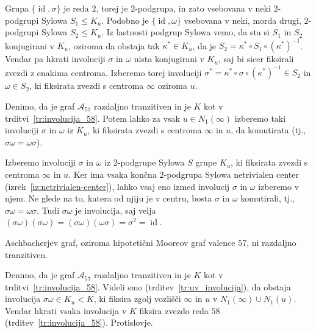 \documentclass[fin1, tisk]{fmfdelo}
\newcommand{\asch}{\mathscr{A}_{57}}
\newcommand{\id}{\operatorname{id}}
\begin{document}
\begin{dokaz}
    Grupa $\{\id, \sigma\}$ je reda $2$, torej je $2$-podgrupa, in zato vsebovana v neki
    $2$-podgrupi Sylowa $S_1 \leq K_{u}$. Podobno je $\{\id, \omega\}$ vsebovana v neki,
    morda drugi, $2$-podgrupi Sylowa $S_2 \leq K_{u}$.
    Iz lastnosti podgrup Sylowa vemo, da sta si $S_1$ in $S_2$ konjugirani v $K_{u}$,
    oziroma da obstaja tak $\kappa^* \in K_{u}$, da je $S_2 = \kappa^* \circ S_1 \circ (\kappa^*)^{-1}$.
    Vendar pa hkrati involuciji $\sigma$ in $\omega$ nista konjugirani v $K_{u}$, saj bi sicer fiksirali zvezdi
    z enakima centroma. Izberemo torej involuciji $\sigma^* = \kappa^* \circ \sigma \circ (\kappa^*)^{-1} \in S_2$
    in $\omega \in S_2$, ki fiksirata zvezdi s centroma $\infty$ oziroma $u$.
\end{dokaz}

\begin{trditev}\label{tr:uv_involucija}
	Denimo, da je graf $\asch$ razdaljno tranzitiven
	in je $K$ kot v tr\-dit\-vi~\ref{tr:involucija_58}.
	Potem lahko za vsak $u \in N_1(\infty)$
    izberemo taki involuciji $\sigma$ in $\omega$ iz $K_{u}$, 
    ki fiksirata zvezdi s centroma $\infty$ in $u$, 
    da komutirata (tj., $\sigma\omega = \omega\sigma$).
\end{trditev}
\begin{dokaz}
    Izberemo involuciji $\sigma$ in $\omega$ iz $2$-podgrupe Sylowa $S$ grupe $K_{u}$, ki fiksirata zvezdi s centroma $\infty$ in $u$.
    Ker ima vsaka končna 
    $2$-podgrupa Sylowa netrivialen center (izrek~\ref{iz:netrivialen-center}), lahko vsaj eno izmed involucij $\sigma$ in $\omega$ izberemo v njem.
    Ne glede na to, katera od njiju je v centru, bosta $\sigma$ in $\omega$ komutirali, tj., $\sigma\omega = \omega\sigma$.
    Tudi $\sigma\omega$ je involucija, saj velja $(\sigma\omega)(\sigma\omega) = (\sigma\omega)(\omega\sigma) = \sigma^2 = \id$. 
\end{dokaz}

\begin{izrek}
    Aschbacherjev graf, oziroma hipotetični Mooreov graf valence $57$, ni razdaljno tranzitiven.
\end{izrek}
\begin{dokaz}
	Denimo, da je graf $\asch$ razdaljno tranzitiven in je $K$ kot v trditvi~\ref{tr:involucija_58}.
    Videli smo (trditev~\ref{tr:uv_involucija}), da obstaja involucija $\sigma\omega \in K_u < K$, ki fiksira zgolj vozlišči $\infty$ in $u$ 
    v $N_1(\infty)\cup N_1(u)$. Vendar hkrati vsaka involucija v $K$ 
    fiksira zvezdo reda $58$ (trditev~\ref{tr:involucija_58}). Protislovje.
\end{dokaz}
\end{document}
